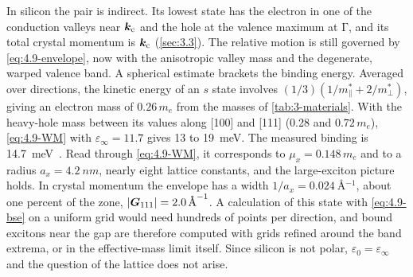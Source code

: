 In silicon the pair is indirect. Its lowest state has the electron in one of the conduction valleys near $\bm{k}_{\mathrm{c}}$ and the hole at the valence maximum at $\mathrm{\Gamma}$, and its total crystal momentum is $\bm{k}_{\mathrm{c}}$ (\cref{sec:3.3}). The relative motion is still governed by \cref{eq:4.9-envelope}, now with the anisotropic valley mass and the degenerate, warped valence band. A spherical estimate brackets the binding energy. Averaged over directions, the kinetic energy of an $s$ state involves $(1/3)(1/m^*_\parallel + 2/m^*_\perp)$, giving an electron mass of $0.26\,m_e$ from the masses of \cref{tab:3-materials}. With the heavy-hole mass between its values along [100] and [111] (0.28 and $0.72\,m_e$), \cref{eq:4.9-WM} with $\varepsilon_\infty = 11.7$ gives 13 to \SI{19}{meV}. The measured binding is \SI{14.7}{meV}~\cite{shaklee1970valley}. Read through \cref{eq:4.9-WM}, it corresponds to $\mu_x = 0.148\,m_e$ and to a radius $a_x = \SI{4.2}{nm}$, nearly eight lattice constants, and the large-exciton picture holds. In crystal momentum the envelope has a width $1/a_x = \SI{0.024}{\angstrom^{-1}}$, about one percent of the zone, $|\bm{G}_{111}| = \SI{2.0}{\angstrom^{-1}}$. A calculation of this state with \cref{eq:4.9-bse} on a uniform grid would need hundreds of points per direction, and bound excitons near the gap are therefore computed with grids refined around the band extrema, or in the effective-mass limit itself. Since silicon is not polar, $\varepsilon_0 = \varepsilon_\infty$ and the question of the lattice does not arise.

